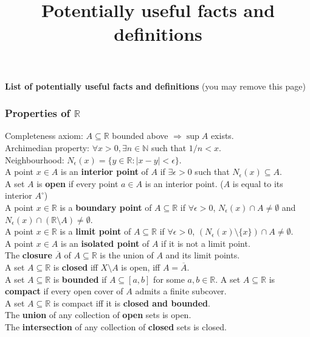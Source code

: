 \documentclass[letterpaper,8pt,landscape]{article}
\title{Potentially useful facts and definitions}
\author{}
\newcommand{\R}{\mathbb{R}}
\begin{document}
\begin{center}
{\bf List of potentially useful facts and definitions} (you may remove this page)
\end{center}
\begin{multicols}{2}
\subsubsection*{Properties of $\R$}
Completeness axiom: $A\subseteq \R$ bounded above $\Rightarrow \sup A$ exists.\\
Archimedian property: $\forall x>0, \exists n\in\mathbb{N}$ such that $1/n<x$.\\
Neighbourhood: $N_\epsilon(x) = \{y\in\R : |x-y|<\epsilon\}$.\\
A point $x\in A$ is an {\bf interior point} of $A$ if $\exists \epsilon>0$ such that $N_\epsilon(x)\subseteq A$.\\
A set $A$ is {\bf open} if every point $a\in A$ is an interior point. ($A$ is equal to its interior $A^\circ$)\\
A point $x\in\R$ is a {\bf boundary point} of $A\subseteq \R$ if $\forall \epsilon>0$, $N_\epsilon(x)\cap A\neq\emptyset$ and $N_\epsilon(x)\cap(\R\setminus A) \neq \emptyset$.\\
A point $x\in \R$ is a {\bf limit point} of $A\subseteq \R$ if $\forall \epsilon>0$, $(N_{\epsilon}(x)\setminus \{x\})\cap A\neq\emptyset$.\\
A point $x\in A$ is an {\bf isolated point} of $A$ if it is not a limit point.\\
The {\bf closure} $\overline{A}$ of $A\subseteq \R$ is the union of $A$ and its limit points.\\
A set $A\subseteq \R$ is {\bf closed} iff $X\setminus A$ is open, iff $A=\overline{A}$.\\
A set $A\subseteq \R$ is {\bf bounded} if $A\subseteq [a,b]$ for some $a,b\in\R$.
A set $A\subseteq \R$ is {\bf compact} if every open cover of $A$ admits a finite subcover.\\
A set $A\subseteq \R$ is compact iff it is {\bf closed and bounded}.\\
The {\bf union} of any collection of {\bf open} sets is open.\\
The {\bf intersection} of any collection of {\bf closed} sets is closed.


\end{multicols}
\end{document}
